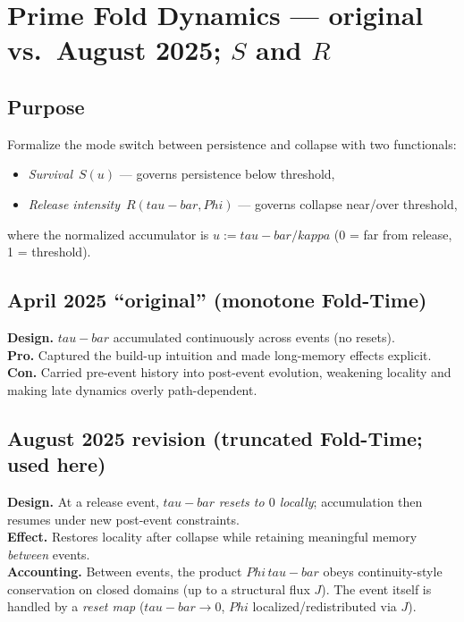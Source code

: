 \documentclass[12pt]{article}
\newcommand{\FoldDensity}{\Phi}
\newcommand{\FoldTime}{\bar{\tau}}
\newcommand{\Threshold}{\kappa}
\newcommand{\Survival}{S}
\newcommand{\Release}{R}
\def\FoldDensity{Phi}%
\def\FoldTime{tau-bar}%
\def\Threshold{kappa}%
\def\Survival{S}%
\def\Release{R}%
\def\bar#1{#1}%
\begin{document}
\section[Prime Fold Dynamics — original vs. August 2025; S and R]{Prime Fold Dynamics — original vs.\ August 2025; $\Survival$ and $\Release$}

\subsection{Purpose}
Formalize the mode switch between persistence and collapse with two functionals:
\begin{itemize}
  \item \emph{Survival} $\,\Survival(u)$ — governs persistence below threshold,
  \item \emph{Release intensity} $\,\Release(\FoldTime,\FoldDensity)$ — governs collapse near/over threshold,
\end{itemize}
where the normalized accumulator is $u := \FoldTime/\Threshold$ (0 = far from release, 1 = threshold).

\subsection{April 2025 ``original'' (monotone Fold-Time)}
\textbf{Design.} $\FoldTime$ accumulated continuously across events (no resets).\\
\textbf{Pro.} Captured the build-up intuition and made long-memory effects explicit.\\
\textbf{Con.} Carried pre-event history into post-event evolution, weakening locality and making late dynamics overly path-dependent.

\subsection{August 2025 revision (truncated Fold-Time; used here)}
\textbf{Design.} At a release event, $\FoldTime$ \emph{resets to $0$ locally}; accumulation then resumes under new post-event constraints.\\
\textbf{Effect.} Restores locality after collapse while retaining meaningful memory \emph{between} events.\\
\textbf{Accounting.} Between events, the product $\FoldDensity\,\FoldTime$ obeys continuity-style conservation on closed domains (up to a structural flux $J$). The event itself is handled by a \emph{reset map} ($\FoldTime\!\to\!0$, $\FoldDensity$ localized/redistributed via $J$).
\end{document}
